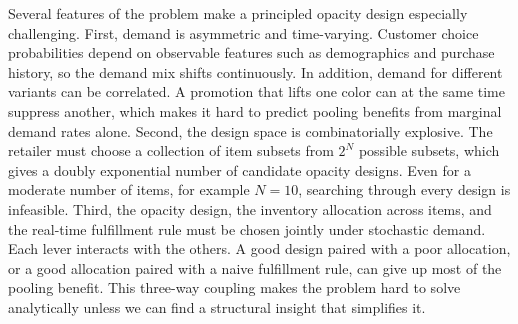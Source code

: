 Several features of the problem make a principled opacity design especially challenging.
First, demand is asymmetric and time-varying.
Customer choice probabilities depend on observable features such as demographics and purchase history, so the demand mix shifts continuously.
In addition, demand for different variants can be correlated.
A promotion that lifts one color can at the same time suppress another, which makes it hard to predict pooling benefits from marginal demand rates alone.
Second, the design space is combinatorially explosive.
The retailer must choose a collection of item subsets from $2^N$ possible subsets, which gives a doubly exponential number of candidate opacity designs.
Even for a moderate number of items, for example $N=10$, searching through every design is infeasible.
Third, the opacity design, the inventory allocation across items, and the real-time fulfillment rule must be chosen jointly under stochastic demand.
Each lever interacts with the others.
A good design paired with a poor allocation, or a good allocation paired with a naive fulfillment rule, can give up most of the pooling benefit.
This three-way coupling makes the problem hard to solve analytically unless we can find a structural insight that simplifies it.

